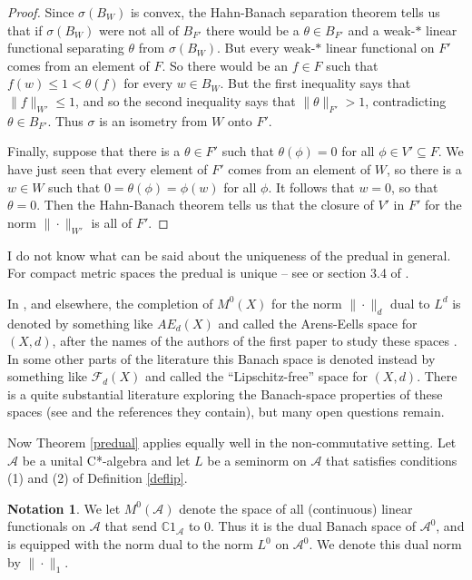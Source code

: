 \documentclass{amsart}[14pt]
\theoremstyle{definition}
\newtheorem{notation}[theorem]{Notation}
\theoremstyle{remark}
\newcommand{\cA}{{\mathcal A}}
\newcommand{\cF}{{\mathcal F}}
\newcommand{\bC}{{\mathbb C}}
\newcommand{\s}{\sigma}
\newcommand{\<}{\langle}
\renewcommand{\>}{\rangle}
\numberwithin{equation}{section}
\begin{document}
{\begin{proof}
 Since  $\s(B_W)$ is convex, the Hahn-Banach separation
 theorem tells us that
if $\s(B_W)$ were not all of $B_{F'}$ there would be a $\theta \in B_{F'}$ and
a weak-$*$ linear functional separating $\theta$ from $\s(B_W)$.  
But every weak-$*$ linear functional on $F'$ comes from an element of $F$.
So there would be an $f \in F$ such that $f(w) \leq 1 < \theta(f)$ for every
$w \in B_W$. But the first inequality says that $\|f\|_{W'} \leq 1$, and so
the second inequality says that $\|\theta\|_{F'} > 1$, contradicting
$\theta \in B_{F'}$. Thus $\s$ is an isometry from $W$ onto $F'$.

Finally, suppose that there is a $\theta \in F'$ such that 
$\theta(\phi) = 0$ for all $\phi \in V' \subseteq F$.
We have just seen that every element of $F'$ comes from an element of $W$,
so there is a $w \in W$ such that $0= \theta(\phi) =  \phi(w)$ for all $\phi$.
It follows that $w = 0$, so that $\theta = 0$. Then the Hahn-Banach theorem
tells us that the closure of $V'$ in $F'$ for the norm $\|\cdot\|_{W'}$ is all of $F'$.
\end{proof} 

I do not know what can be said about the uniqueness of the predual in general.
For compact metric spaces the predual is unique -- see 
\cite{Wvr3} or section 3.4 of \cite{Wvr4}.

In \cite{Wvr4}, and elsewhere, the completion of $M^0(X)$ 
for the norm $\| \cdot \|_d $ dual 
to $L^d$ is denoted by something like $AE_d(X)$ and called the
Arens-Eells space for $(X, d)$, after the names of the authors 
of the first paper to study these spaces \cite{ArE}.
In some other parts of the literature
this Banach space is denoted instead by something 
like $\cF_d(X)$ and called the
``Lipschitz-free'' space for $(X, d)$. There is a quite substantial literature
exploring the Banach-space properties of these spaces (see
\cite{DKO, OstO} and the references they contain), but many open questions remain.  

Now Theorem \ref{predual} applies equally well in the non-commutative
setting. Let $\cA$ be a unital C*-algebra and let $L$ be a seminorm on
$\cA$ that satisfies conditions (1) and (2) of Definition \ref{deflip}.

\begin{notation}
\label{ncpd}
We let $M^0(\cA)$ denote the space of all (continuous)
linear functionals on $\cA$ that send $\bC 1_\cA$ to 0.
Thus it is the dual Banach space of $\cA^0$, and is equipped
with the norm dual to the norm $L^0$ on $\cA^0$.
We denote this dual norm by $\|\cdot\|_1$. 
\end{notation}

}
\end{document}
